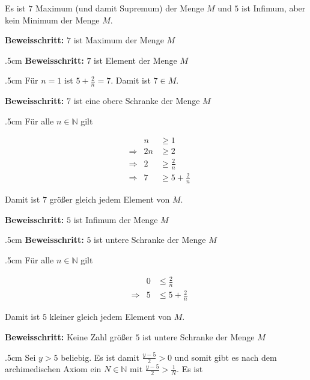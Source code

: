 \documentclass[fontsize=9pt,
               parskip=half-,
               DIV=14,
               listof=chapterentry,
               tocflat]{scrbook}
\newenvironment{indentblock}{\begin{adjustwidth}{.5cm}{}}{\end{adjustwidth}}
\newcommand{\proofstep}[1]{\textbf{\textcolor{sblau}{#1}}}
\begin{document}
\begin{proof*}
Es ist $7$ Maximum (und damit Supremum) der Menge $M$ und $5$ ist Infimum, aber kein Minimum der Menge $M$.

\proofstep{Beweisschritt:}
 $7$ ist Maximum der Menge $M$\begin{indentblock}
\proofstep{Beweisschritt:}
 $7$ ist Element der Menge $M$\begin{indentblock}
Für $n=1$ ist $5+{\tfrac {2}{n}}=7$. Damit ist $7\in M$.

\end{indentblock}

\proofstep{Beweisschritt:}
 $7$ ist eine obere Schranke der Menge $M$\begin{indentblock}
Für alle $n\in \mathbb {N} $ gilt

\begin{align*}
&&n&\geq 1\\&\Rightarrow &2n&\geq 2\\&\Rightarrow &2&\geq {\tfrac {2}{n}}\\&\Rightarrow &7&\geq 5+{\tfrac {2}{n}}
\end{align*}

Damit ist $7$ größer gleich jedem Element von $M$.

\end{indentblock}

\end{indentblock}

\proofstep{Beweisschritt:}
 $5$ ist Infimum der Menge $M$\begin{indentblock}
\proofstep{Beweisschritt:}
 $5$ ist untere Schranke der Menge $M$\begin{indentblock}
Für alle $n\in \mathbb {N} $ gilt

\begin{align*}
&&0&\leq {\tfrac {2}{n}}\\&\Rightarrow &5&\leq 5+{\tfrac {2}{n}}
\end{align*}

Damit ist $5$ kleiner gleich jedem Element von $M$.

\end{indentblock}

\proofstep{Beweisschritt:}
 Keine Zahl größer $5$ ist untere Schranke der Menge $M$\begin{indentblock}
Sei $y>5$ beliebig. Es ist damit ${\tfrac {y-5}{2}}>0$ und somit gibt es nach dem archimedischen Axiom ein $N\in \mathbb {N} $ mit ${\tfrac {y-5}{2}}>{\tfrac {1}{N}}$. Es ist


\end{indentblock}
\end{indentblock}
\end{proof*}
\end{document}

